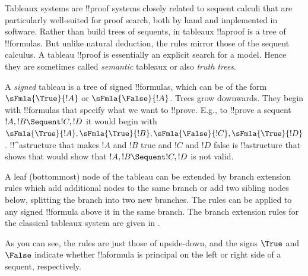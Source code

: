 \documentclass[../../../include/open-logic-section]{subfiles}
\begin{document}


Tableaux systems are !!{proof} systems closely related to sequent
calculi that are particularly well-suited for proof search, both by
hand and implemented in software. Rather than build trees of sequents,
in tableaux !!a{proof} is a tree of !!{formula}s. But unlike natural
deduction, the rules mirror those of the sequent calculus. A tableau
!!{proof} is essentially an explicit search for a model. Hence they
are sometimes called \emph{semantic} tableaux or also \emph{truth
trees}.

A \emph{signed} tableau is a tree of signed !!{formula}s, which can be
of the form $\sFmla{\True}{!A}$ or $\sFmla{\False}{!A}$. Trees grow
downwards. They begin with !!{formula}s that specify what we want to
!!{prove}. E.g., to !!{prove} a sequent $!A, !B \Sequent !C, !D$ it
would begin with $\sFmla{\True}{!A}, \sFmla{\True}{!B},
\sFmla{\False}{!C}, \sFmla{\True}{!D}$. !!^a{structure} that makes
$!A$ and $!B$ true and $!C$ and $!D$ false is !!a{structure} that
shows that would show that $!A, !B \Sequent !C, !D$ is not valid. 

A leaf (bottommost) node of the tableau can be extended by branch
extension rules which add additional nodes to the same branch or add
two sibling nodes below, splitting the branch into two new branches.
The rules can be applied to any signed !!{formula} above it in the
same branch. The branch extension rules for the classical tableaux
system  are given in .



As you can see, the rules are just those of  upside-down, and
the signs $\True$ and $\False$ indicate whether !!a{formula} is
principal on the left or right side of a sequent, respectively.
\end{document}
